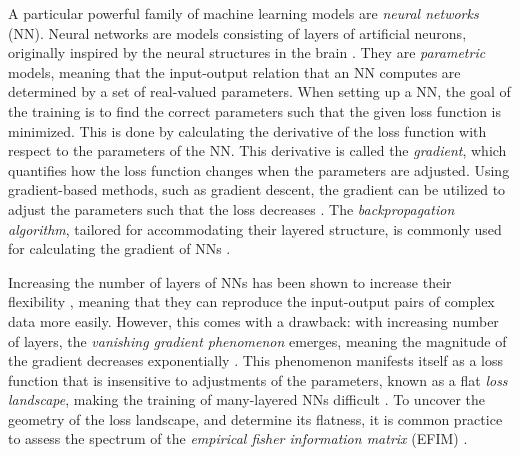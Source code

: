 A particular powerful family of machine learning models are \emph{neural networks} (NN). Neural networks are models consisting of layers of artificial neurons, originally inspired by the neural structures in the brain \cite{hands-on}. They are \emph{parametric} models, meaning that the input-output relation that an NN computes are determined by a set of real-valued parameters. When setting up a NN, the goal of the training is to find the correct parameters such that the given loss function is minimized. This is done by calculating the derivative of the loss function with respect to the parameters of the NN. This derivative is called the \emph{gradient}, which quantifies how the loss function changes when the parameters are adjusted. Using gradient-based methods, such as gradient descent, the gradient can be utilized to adjust the parameters such that the loss decreases \cite{hands-on}. The \emph{backpropagation algorithm}, tailored for accommodating their layered structure, is commonly used for calculating the gradient of NNs \cite{hands-on}. 

Increasing the number of layers of NNs has been shown to increase their flexibility \cite{raghu2017expressive}, meaning that they can reproduce the input-output pairs of complex data more easily. However, this comes with a drawback: with increasing number of layers, the \emph{vanishing gradient phenomenon} emerges, meaning the magnitude of the gradient decreases exponentially \cite{LeCun2012}. This phenomenon manifests itself as a loss function that is insensitive to adjustments of the parameters, known as a flat \emph{loss landscape}, making the training of many-layered NNs difficult \cite{karakida2019universal}. To uncover the geometry of the loss landscape, and determine its flatness, it is common practice to assess the spectrum of the \emph{empirical fisher information matrix} (EFIM) \cite{karakida2019universal}.


